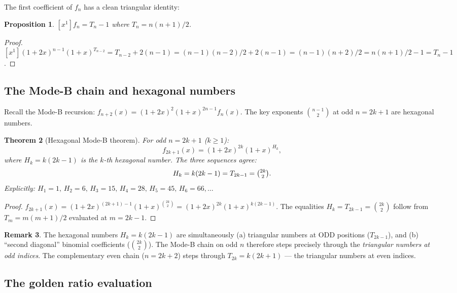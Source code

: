 \documentclass[12pt,reqno]{amsart}
\newtheorem{theorem}{Theorem}[section]
\newtheorem{proposition}[theorem]{Proposition}
\theoremstyle{definition}
\newtheorem{remark}[theorem]{Remark}
\theoremstyle{plain}
\begin{document}
The first coefficient of $f_n$ has a clean triangular identity:

\begin{proposition}\label{prop:x1-triangular}
$[x^1]f_n = T_n - 1$ where $T_n=n(n+1)/2$.
\end{proposition}

\begin{proof}
$[x^1](1+2x)^{n-1}(1+x)^{T_{n-2}}
= T_{n-2}+2(n-1)=(n-1)(n-2)/2+2(n-1)=(n-1)(n+2)/2=n(n+1)/2-1=T_n-1$.
\end{proof}

\subsection{The Mode-B chain and hexagonal numbers}
\label{ssec:hexagonal}

Recall the Mode-B recursion: $f_{n+2}(x)=(1+2x)^2(1+x)^{2n-1}f_n(x)$.
The key exponents $\binom{n-1}{2}$ at odd $n=2k+1$ are hexagonal numbers.

\begin{theorem}[Hexagonal Mode-B theorem]\label{thm:hexagonal}
For odd $n=2k+1$ ($k\ge 1$):
\[
  f_{2k+1}(x)=(1+2x)^{2k}(1+x)^{H_k},
\]
where $H_k=k(2k-1)$ is the $k$-th hexagonal number.  The three sequences
agree:
\[
  H_k=k(2k-1)=T_{2k-1}=\tbinom{2k}{2}.
\]
Explicitly: $H_1=1,\,H_2=6,\,H_3=15,\,H_4=28,\,H_5=45,\,H_6=66,\ldots$
\end{theorem}

\begin{proof}
$f_{2k+1}(x)=(1+2x)^{(2k+1)-1}(1+x)^{\binom{2k}{2}}=(1+2x)^{2k}(1+x)^{k(2k-1)}$.
The equalities $H_k=T_{2k-1}=\binom{2k}{2}$ follow from $T_m=m(m+1)/2$
evaluated at $m=2k-1$.
\end{proof}

\begin{remark}
The hexagonal numbers $H_k=k(2k-1)$ are simultaneously
(a) triangular numbers at ODD positions ($T_{2k-1}$), and
(b) ``second diagonal'' binomial coefficients ($\binom{2k}{2}$).
The Mode-B chain on odd $n$ therefore steps precisely through the
\emph{triangular numbers at odd indices}.  The complementary even chain
($n=2k+2$) steps through $T_{2k}=k(2k+1)$ — the triangular numbers at
even indices.
\end{remark}

\subsection{The golden ratio evaluation}
\label{ssec:golden}
\end{document}
